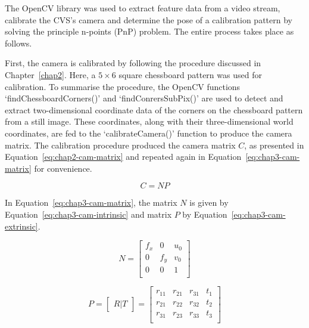 The OpenCV library was used to extract feature data from a video stream, calibrate the CVS's camera and determine the pose of a calibration pattern by solving the principle n-points (PnP) problem. The entire process takes place as follows. 

First, the camera is calibrated by following the procedure discussed in Chapter~\ref{chap2}. Here, a $5\times6$ square chessboard pattern was used for calibration. To summarise the procedure, the OpenCV functions `findChessboardCorners()' and `findConrersSubPix()' are used to detect and extract two-dimensional coordinate data of the corners on the chessboard pattern from a still image. These coordinates, along with their three-dimensional world coordinates, are fed to the `calibrateCamera()' function to produce the camera matrix. The calibration procedure produced the camera matrix $C$, as presented in Equation~\ref{eq:chap2-cam-matrix} and repeated again in Equation~\ref{eq:chap3-cam-matrix} for convenience. 

\begin{equation}
  \label{eq:chap3-cam-matrix}
  C = 
  NP
\end{equation}

In Equation~\ref{eq:chap3-cam-matrix}, the matrix $N$ is given by Equation~\ref{eq:chap3-cam-intrinsic} and matrix $P$ by Equation~\ref{eq:chap3-cam-extrinsic}.

\begin{equation}
  \label{eq:chap3-cam-intrinsic}
  N = 
  \begin{bmatrix}
    f_x & 0   & u_0 \\
    0   & f_y & v_0 \\
    0   & 0   & 1   \\
  \end{bmatrix}
\end{equation}

\begin{equation}
  \label{eq:chap3-cam-extrinsic}
  P = 
  \begin{bmatrix}
    R | T
  \end{bmatrix}
  =
  \begin{bmatrix}
    r_{11} & r_{21} & r_{31} & t_1 \\
    r_{21} & r_{22} & r_{32} & t_2 \\
    r_{31} & r_{23} & r_{33} & t_3 \\
  \end{bmatrix}
\end{equation}

